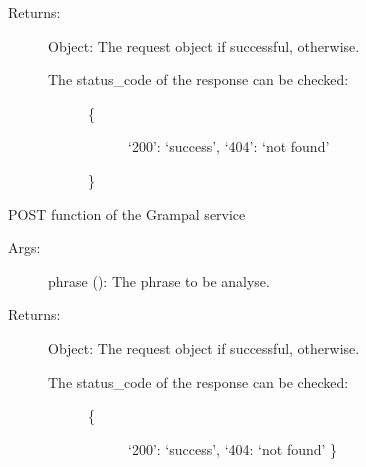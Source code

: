 \documentclass[letterpaper,10pt,english]{sphinxmanual}
\begin{document}
\begin{fulllineitems}
\begin{fulllineitems}
\begin{description}
\item[{Returns:}] \leavevmode
Object: The request object if successful,  otherwise.
\begin{description}
\item[{The status\_code of the response can be checked:}] \leavevmode\begin{description}
\item[{\{}] \leavevmode
‘200’: ‘success’,                                       ‘404’: ‘not found’

\end{description}

\}

\end{description}

\end{description}

\end{fulllineitems}


\begin{fulllineitems}
\label{\detokenize{ws:ws.Grampal.analiza_post}}
POST function of the Grampal service
\begin{description}
\item[{Args:}] \leavevmode
phrase (): The phrase to be analyse.

\item[{Returns:}] \leavevmode
Object: The request object if successful,  otherwise.
\begin{description}
\item[{The status\_code of the response can be checked:}] \leavevmode\begin{description}
\item[{\{}] \leavevmode
‘200’: ‘success’,                                       ‘404: ‘not found’                               \}

\end{description}

\end{description}

\end{description}

\end{fulllineitems}


\end{fulllineitems}
\end{document}
